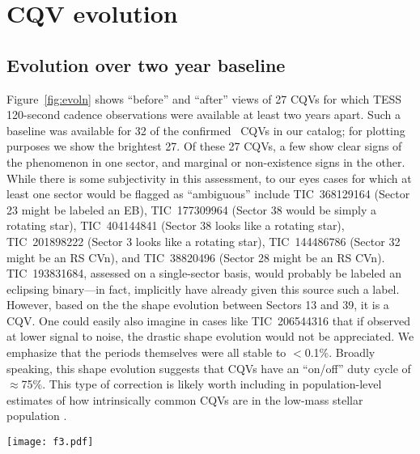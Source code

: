 \documentclass[11pt,twocolumn,tighten]{aastex63}
\begin{document}
\section{CQV evolution}
\label{sec:evoln}

\subsection{Evolution over two year baseline}

Figure~\ref{fig:evoln} shows ``before'' and ``after'' views of 27 CQVs
for which TESS 120-second cadence observations were available at least
two years apart.  Such a baseline was available for 32 of the
confirmed \ngoods\ CQVs in our catalog; for plotting purposes we show
the brightest 27.  Of these 27 CQVs, a few show clear signs of the
phenomenon in one sector, and marginal or non-existence signs in the
other.  While there is some subjectivity in this assessment, to our
eyes cases for which at least one sector would be flagged as
``ambiguous'' include
TIC~368129164 (Sector 23 might be labeled an EB),
TIC~177309964 (Sector 38 would be simply a rotating star),
TIC~404144841 (Sector 38 looks like a rotating star),
TIC~201898222 (Sector 3 looks like a rotating star),
TIC~144486786 (Sector 32 might be an RS CVn),
and
TIC~38820496 (Sector 28 might be an RS CVn).
TIC~193831684, assessed on a single-sector basis, would probably be
labeled an eclipsing binary---in fact, \citet{2021ApJ...912..123J}
implicitly have already given this source such a label.  However,
based on the the shape evolution between Sectors 13 and 39, it is a
CQV.  One could easily also imagine in cases like TIC~206544316 that
if observed at lower signal to noise, the drastic shape evolution
would not be appreciated.  We emphasize that the periods themselves
were all stable to $<$0.1\%.  Broadly speaking, this shape evolution
suggests that CQVs have an ``on/off'' duty cycle of $\approx$75\%.
This type of correction is likely worth including in population-level
estimates of how intrinsically common CQVs are in the low-mass stellar
population \citep[e.g.][]{2022AJ....163..144G}.


\begin{figure*}[!tp]
	\begin{center}
		\centering
		\texttt{[image: f3.pdf]}
		\vspace{-0.6cm}
		\caption{
		{\bf CQVs keep their periods but change their shapes.}
      32 of our \ngoods\ CQVs from Figure~\ref{fig:cqvs} had
      120-second cadence TESS data available for a baseline of at
      least two years; the 27 brightest are shown here.  Each panel
      shows one sector of TESS data, and is phased to its deepest
      minimum in flux.  Each panel's title shows the TIC identifier
      and approximate period in hours.  Text insets show the TESS
      sector numbers, which generally span two years, or at least
      1{,}000 cycles.  The vertical scale is fixed across sectors to
      clarify shape changes.
		}
		\label{fig:evoln}
	\end{center}
\end{figure*}
\end{document}
